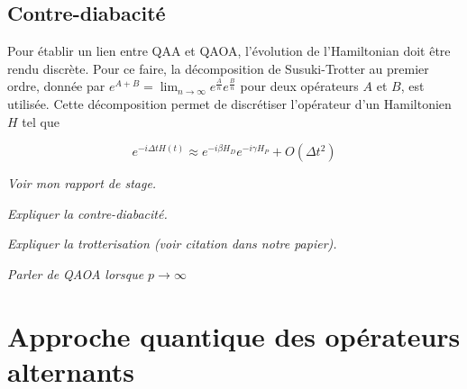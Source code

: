 
\subsection{Contre-diabacité}

Pour établir un lien entre QAA et QAOA, l'évolution de l'Hamiltonian doit être rendu discrète. Pour ce faire, la décomposition de Susuki-Trotter au premier ordre, donnée par $e^{A+B} = \lim_{n \to \infty} e^{\frac{A}{n}} e^{\frac{B}{n}}$ pour deux opérateurs $A$ et $B$, est utilisée. Cette décomposition permet de discrétiser l'opérateur d'un Hamiltonien $H$ tel que

\begin{equation}
    e^{-i\Delta t H(t)} \approx e^{-i \beta H_D} e^{-i \gamma H_P} + O(\Delta t^2)
\end{equation}

\textcolor{mydarkred}{\textit{Voir mon rapport de stage.}}

\textcolor{mydarkred}{\textit{Expliquer la contre-diabacité.}}

\textcolor{mydarkred}{\textit{Expliquer la trotterisation (voir citation dans notre papier).}}

\textcolor{mydarkred}{\textit{Parler de QAOA lorsque $p \to \infty$}}



\section{Approche quantique des opérateurs alternants}

